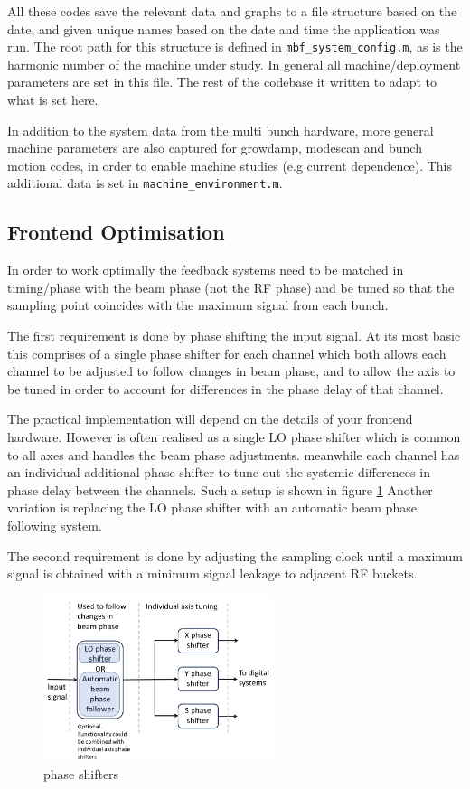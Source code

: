 \documentclass{report}
\begin{document}
All these codes save the relevant data and graphs to a file structure based on the date, and given unique names based on the date and time the application was run. The root path for this structure is defined in \verb|mbf_system_config.m|, as is the harmonic number of the machine under study. In general all machine/deployment parameters are set in this file. The rest of the codebase it written to adapt to what is set here.

In addition to the system data from the multi bunch hardware, more general machine parameters are also captured for growdamp, modescan and bunch motion codes, in order to enable machine studies (e.g current dependence). This additional data is set in \verb|machine_environment.m|.

\subsection{Frontend Optimisation}
In order to work optimally the feedback systems need to be matched in timing/phase with the beam phase (not the RF phase) and be tuned so that the sampling point coincides with the maximum signal from each bunch.

The first requirement is done by phase shifting the input signal. At its most basic this comprises of a single phase shifter for each channel which both allows each channel to be adjusted to follow changes in beam phase, and to allow the axis to be  tuned in order to account for differences in the phase delay of that channel.

The practical implementation will depend on the details of your frontend hardware.
However is often realised as a single LO phase shifter which is common to all axes and handles the beam phase adjustments. meanwhile each channel has an individual additional phase shifter to tune out the systemic differences in phase delay between the channels. Such a setup is shown in figure \ref{fig:phase_shifters}
Another variation is replacing the LO phase shifter with an automatic beam phase following system.

The second requirement is done by adjusting the sampling clock until a maximum signal is obtained with a minimum signal leakage to adjacent RF buckets.
\begin{figure}[hbt]
    \centering
        \includegraphics[width=0.6\textwidth]{phase_shifters_overview.png}
        \caption{phase shifters}
        \label{fig:phase_shifters}
\end{figure}
\end{document}
